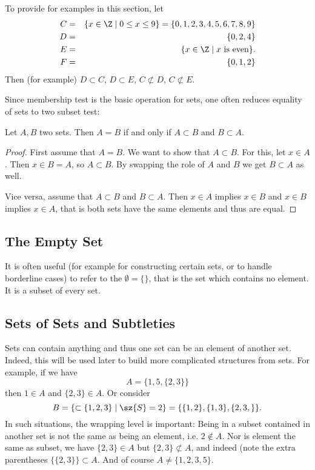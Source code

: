 To provide for examples in this section, let 
\begin{eqnarray*}
C&=&\{x\in\Z\mid 0\le x\le9\}=\{0,1,2,3,4,5,6,7,8,9\}\\
D&=&\{0,2,4\}\\
E&=&\{x\in\Z\mid \mbox{$x$ is even}\}.\\
F&=&\{0,1,2\}\\
\end{eqnarray*}
Then (for example) $D\subset C$, $D\subset E$, $C\not\subset D$,
$C\not\subset E$.

Since membership test is the basic operation for sets, one often reduces
equality of sets to two subset test:
\begin{lemma}
Let $A,B$ two sets. Then $A=B$ if and only if $A\subset B$ and $B\subset A$.
\end{lemma}
\begin{proof}
First assume that $A=B$. We want to show that $A\subset B$. For this, let
$x\in A$. Then $x\in B=A$, so $A\subset B$. By swapping the role of $A$ and
$B$ we get $B\subset A$ as well.

Vice versa, assume that $A\subset B$ and $B\subset A$. Then $x\in A$ implies
$x\in B$ and $x\in B$ implies $x\in A$, that is both sets have the same
elements and thus are equal.
\end{proof}

\subsection{The Empty Set}

It is often useful (for example for constructing certain sets, or to handle
borderline cases) to refer to the  $\emptyset=\{\}$, that
is the set which contains no element. It is a subset of every set.

\subsection{Sets of Sets and Subtleties}

Sets can contain anything and thus one set can be an element of another set.
Indeed, this will be used later to build more complicated structures from
sets.
For example, if we have
\[
A=\{1,5,\{2,3\}\}
\]
then $1\in A$ and $\{2,3\}\in A$. Or consider
\[
B=\{\subset\{1,2,3\}\mid \sz{S}=2\}=\{\{1,2\},\{1,3\},\{2,3,\}\}.
\]
In such situations, the wrapping level is important: 
Being in a subset contained in another set is not the same as being an
element, i.e. $2\not\in A$. Nor is element the same as subset, we have
$\{2,3\}\in A$ but $\{2,3\}\not\subset A$, and indeed (note the extra
parentheses $\{\{2,3\}\}\subset A$. And of course $A\not=\{1,2,3,5\}$.

